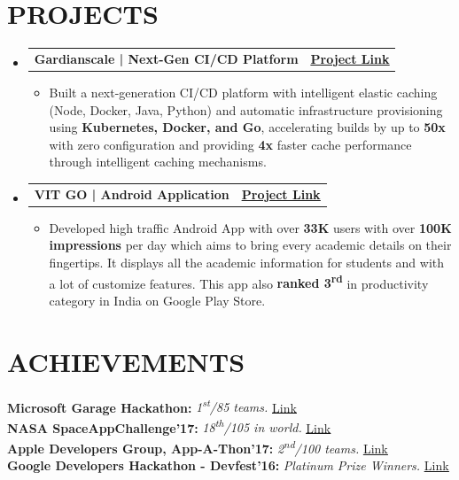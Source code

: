 \documentclass[letterpaper,11pt]{article}
\makeatletter
\newcommand{\resumeItem}[1]{
  \item\small{
    {#1 \vspace{-2pt}}
  }
}
\newcommand{\resumeProjectHeading}[2]{
    \item
    \begin{tabular*}{1.001\textwidth}{l@{\extracolsep{\fill}}r}
      \small#1 & \textbf{\small #2}\\
    \end{tabular*}\vspace{-7pt}
}
\newcommand{\resumeSubHeadingListStart}{\begin{itemize}[leftmargin=0.0in, label={}]}
\newcommand{\resumeSubHeadingListEnd}{\end{itemize}}
\newcommand{\resumeItemListStart}{\begin{itemize}}
\newcommand{\resumeItemListEnd}{\end{itemize}\vspace{-5pt}}
\makeatother
\begin{document}
\section{PROJECTS}
    \vspace{-5pt}
    \resumeSubHeadingListStart
    \resumeProjectHeading
          {\textbf{Gardianscale | Next-Gen CI/CD Platform}}{\href{https://gardianscale.com}{\bf \underline{Project Link}}}
          \resumeItemListStart
            \resumeItem{Built a next-generation CI/CD platform with intelligent elastic caching (Node, Docker, Java, Python) and automatic infrastructure provisioning using {\bf Kubernetes, Docker, and Go}, accelerating builds by up to \textbf{50x} with zero configuration and providing \textbf{4x} faster cache performance through intelligent caching mechanisms.}
          \resumeItemListEnd
          \vspace{-19pt}
    \resumeProjectHeading
          {\textbf{VIT GO | Android Application }}{ {\href{https://github.com/mayankagg9722/VIT-Go}{\underline {\normalsize Project Link}}}}
          \resumeItemListStart
            \resumeItem{Developed high traffic Android App  with over \textbf{33K} users with over \textbf{100K impressions} per day which aims to bring every academic details on their fingertips. It displays all the academic information for students and with a lot of customize features. This app also \textbf{ranked 3\textsuperscript{rd}} in productivity category in India on Google Play Store.}
          \resumeItemListEnd
    \resumeSubHeadingListEnd
\vspace{-16pt}

\section{ACHIEVEMENTS}
 \begin{itemize}[leftmargin=0.15in, label={}]
    \small{\item{
     \textbf{Microsoft Garage Hackathon: }\emph{1\textsuperscript{st}/85 teams. }{\href{https://youtu.be/0-dl__J98mo}{\underline {Link}}} \\
     \textbf{NASA SpaceAppChallenge'17: }\emph{18\textsuperscript{th}/105 in world. }{\href{https://2017.spaceappschallenge.org/challenges/planetary-blues/wheres-water/teams/team-go}{\underline {Link}}} \\
     \textbf{Apple Developers Group, App-A-Thon'17: }\emph{2\textsuperscript{nd}/100 teams. } {\href{https://www.youtube.com/watch?v=jBxkavGlVPU}{\underline {Link}}} \\
     \textbf{Google Developers Hackathon - Devfest'16: }\emph{Platinum Prize Winners. } {\href{https://github.com/mayankagg9722/miBeatChat}{\underline {Link}}} \\
    }}
 \end{itemize}
 \vspace{-16pt}
\end{document}
